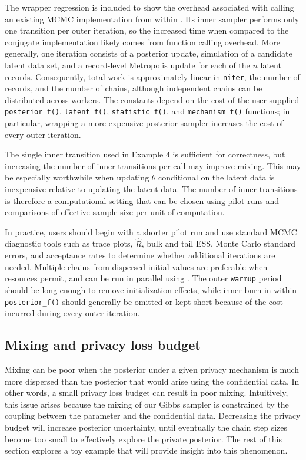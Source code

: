 The wrapper regression is included to show the overhead associated with calling
an existing MCMC implementation from within . Its inner sampler
performs only one transition per outer iteration, so the increased time when compared
to the conjugate implementation likely
comes from function calling overhead.
More generally, one  iteration consists of a posterior update, simulation of a
candidate latent data set, and a record-level Metropolis update for each of the
\(n\) latent records. Consequently, total work is approximately linear in
\texttt{niter}, the number of records, and the number of chains, although independent
chains can be distributed across workers. The constants depend on the cost of
the user-supplied \texttt{posterior\_f()}, \texttt{latent\_f()}, \texttt{statistic\_f()}, and
\texttt{mechanism\_f()} functions; in particular, wrapping a more expensive posterior
sampler increases the cost of every outer iteration.

The single inner transition used in Example 4 is sufficient for correctness,
but increasing the number of inner transitions per call may improve mixing.
This may be especially worthwhile when updating \(\theta\) conditional on the
latent data is inexpensive relative to updating the latent data. The number of
inner transitions is therefore a computational setting that can be chosen using
pilot runs and comparisons of effective sample size per unit of computation.

In practice, users should begin with a shorter pilot run and use
standard MCMC diagnostic tools such as trace plots,
\(\widehat{R}\), bulk and tail ESS, Monte Carlo standard errors, and acceptance
rates to determine whether additional iterations are needed. Multiple chains
from dispersed initial values are preferable when resources permit, and can be
run in parallel using . The outer \texttt{warmup} period should be long
enough to remove initialization effects, while inner burn-in within \texttt{posterior\_f()}
should generally be omitted or kept short because of the cost incurred during every outer iteration.

\subsection{Mixing and privacy loss budget}\label{sec:mixing}

Mixing can be poor when the posterior under a given privacy mechanism is much
more dispersed than the posterior that would arise using the confidential data. In
other words, a small privacy loss budget can result in poor mixing. Intuitively,
this issue arises because the mixing of our Gibbs sampler is constrained by the
coupling between the parameter and the confidential data. Decreasing the privacy
budget will increase posterior uncertainty, until eventually the chain step
sizes become too small to effectively explore the private posterior.
The rest of this section explores a toy example that will provide insight into this
phenomenon.

